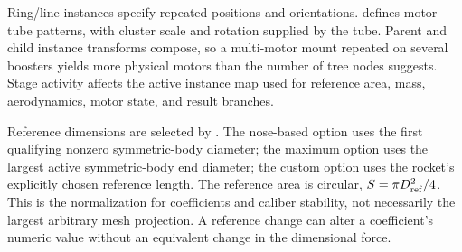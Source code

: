 Ring/line instances specify repeated positions and orientations.  defines motor-tube patterns, with cluster scale and rotation supplied by the tube. Parent and child instance transforms compose, so a multi-motor mount repeated on several boosters yields more physical motors than the number of tree nodes suggests. Stage activity affects the active instance map used for reference area, mass, aerodynamics, motor state, and result branches.

Reference dimensions are selected by . The nose-based option uses the first qualifying nonzero symmetric-body diameter; the maximum option uses the largest active symmetric-body end diameter; the custom option uses the rocket's explicitly chosen reference length. The reference area is circular, $S=\pi D_{\rm ref}^2/4$. This is the normalization for coefficients and caliber stability, not necessarily the largest arbitrary mesh projection. A reference change can alter a coefficient's numeric value without an equivalent change in the dimensional force.


